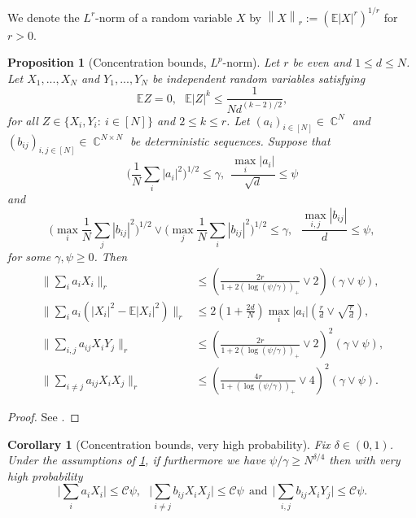 \documentclass[10pt,a4paper]{amsart}
\DeclareMathOperator{\CC}{\mathbb{C}}
\newcommand{\abs}[1]{\left| #1 \right|}
\newcommand{\absbb}[1]{\biggl| #1 \biggr|}
\newcommand{\norm}[1]{\left\| #1 \right\|}
\newcommand{\normbb}[1]{\biggl\| #1 \biggr\|}
\newcommand{\E}{\mathbb{E}}
\newtheorem{prop}{Proposition}[section]
\newtheorem{corollary}{Corollary}[section]
\numberwithin{equation}{section}
\begin{document}
	We denote the $L^r$-norm of a random variable $X$ by $\norm{X}_r:= ( \E \abs{X}^r)^{1/r}$ for $r >0$.  
	\begin{prop}[Concentration bounds, $L^p$-norm]\label{prop:lardev}
		Let $r$ be even and $1 \le d \le N$. Let $X_1,...,X_{N}$ and $Y_1,...,Y_N$ be independent random variables satisfying
		\begin{equation*}\label{eq:condiXYconcentration}
			\mathbb{E}Z  =0, ~~~ \mathbb{E}  \abs{Z}^k  \le \frac{1}{N d^{(k-2)/2}},
		\end{equation*}
		for all $Z \in \{X_i,Y_i:~ i \in [N]\}$ and $2 \le k \le r$. Let $(a_{i})_{i \in [N]} \in \CC^N$ and $(b_{ij})_{i,j \in [N]} \in \CC^{N \times N}$ be deterministic sequences. Suppose that
		\begin{equation*}
			\bigg( \frac{1}{N} \sum_{i} \abs{a_i}^2\bigg)^{1/2} \le \gamma,~~ \frac{\max_i \abs{a_i}}{\sqrt{d}} \le \psi
		\end{equation*}
		and 
		\begin{equation*}
			\bigg( \max_{i} \frac{1}{N} \sum_j \left|b_{ij}\right|^2 \bigg)^{1/2} \vee \bigg( \max_{j} \frac{1}{N} \sum_i \left|b_{ij}\right|^2 \bigg)^{1/2} \le \gamma, ~~~ \frac{\max_{i,j} \left|b_{ij}\right|}{d} \le \psi,
		\end{equation*}
		for some $\gamma, \psi \ge 0$. Then
		\begin{align}
			\normbb{\sum_{i}a_i X_i}_{r} &\le \left( \frac{2r}{1+ 2(\log(\psi/\gamma))_{+}} \vee 2 \right) (\gamma \vee \psi),\label{eq:sumaiXi}\\
			\normbb{\sum_{i}a_i \left(\abs{X_i}^2  - \mathbb{E}\abs{X_{i}}^2\right) }_{r} &\le 2\left( 1+  \frac{2d}{N} \right) \max_{i} |a_i|\left( \frac{r}{d} \vee \sqrt{\frac{r}{d}} \right),\label{eq:sumaiXi2}\\
			\normbb{\sum_{i,j} a_{ij}X_i Y_j}_{r} &\le  \left( \frac{2r}{1+ 2(\log(\psi/\gamma))_{+}} \vee 2 \right)^2 (\gamma \vee \psi),\label{eq:sumaijXiYj}\\
			\normbb{\sum_{i\neq j} a_{ij}X_i X_j}_{r} &\le  \left( \frac{4r}{1+ (\log(\psi/\gamma))_{+}} \vee 4 \right)^2 (\gamma \vee \psi).\label{eq:sumaijXiXj}
		\end{align}
	\end{prop}
	\begin{proof}
		See \cite[Proposition 3.1, Proposition 3.2, Proposition 3.3, Proposition 3.5]{MR4021251}.
	\end{proof}
	\begin{corollary}[Concentration bounds, very high probability] \label{lemma:dev1}
		Fix $\delta \in (0,1)$. Under the assumptions of \cref{prop:lardev}, if furthermore we have $\psi/ \gamma \ge N^{\delta/ 4}$ then with very high probability
		\begin{equation*}
			\absbb{ \sum_{i} a_i X_{i}} \le \mathcal{C} \psi,~~~\absbb{ \sum_{i  \neq  j} b_{ij} X_{i}X_{j}} \le \mathcal{C} \psi ~~ \text{and} ~~  \absbb{\sum_{i,j} b_{ij} X_i Y_j} \leq \mathcal C \psi. 
		\end{equation*}
	\end{corollary}
\end{document}
